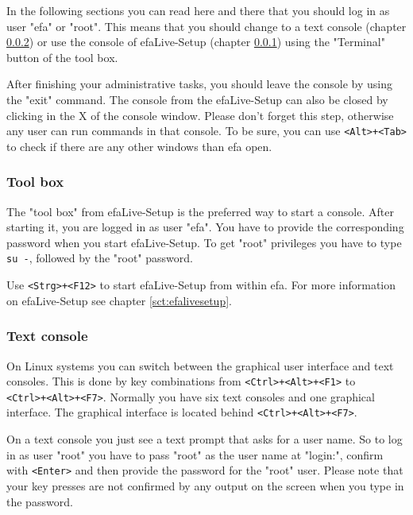 \documentclass[a4paper,12pt,twoside]{article}
\begin{document}
In the following sections you can read here and there that you should
log in as user "efa" or
"root". This means that you should change
to a text console (chapter \ref{sct:text_console}) or use
the console of efaLive-Setup (chapter \ref{sct:toolbox})
using the "Terminal" button of the tool
box.

After finishing your administrative tasks, you should leave the console
by using the "exit" command. The console
from the efaLive-Setup can also be closed by clicking in the X of the
console window. Please don't forget this step,
otherwise any user can run commands in that console. To be sure, you
can use \texttt{{\textless}Alt{\textgreater}+{\textless}Tab{\textgreater}} to
check if there are any other windows than efa open.


\subsubsection{Tool box}
\label{sct:toolbox}
The "tool box" from efaLive-Setup is the preferred way to start a
console. After starting it, you are logged in as user
"efa". You have to provide the
corresponding password when you start efaLive-Setup. To get
"root" privileges you have to type
\texttt{su -}, followed by the
"root" password.

Use \texttt{{\textless}Strg{\textgreater}+{\textless}F12{\textgreater}} to start
efaLive-Setup from within efa. For more information on efaLive-Setup
see chapter \ref{sct:efalivesetup}.

\subsubsection{Text console}
\label{sct:text_console}
On Linux systems you can switch
between the graphical user interface and text consoles. This is done by
key combinations from
\texttt{{\textless}Ctrl{\textgreater}+{\textless}Alt{\textgreater}+{\textless}F1{\textgreater}} to\\
\texttt{{\textless}Ctrl{\textgreater}+{\textless}Alt{\textgreater}+{\textless}F7{\textgreater}}.
Normally you have six text consoles and one graphical interface. The graphical interface is located behind \texttt{{\textless}Ctrl{\textgreater}+{\textless}Alt{\textgreater}+{\textless}F7{\textgreater}}.

On a text console you just see a text prompt that asks for a user name.
So to log in as user "root" you have to
pass "root" as the user name at
"login:", confirm with
\texttt{{\textless}Enter{\textgreater}} and then provide the password for the
"root" user. Please note that your key
presses are not confirmed by any output on the screen when you type in
the password.
\end{document}
